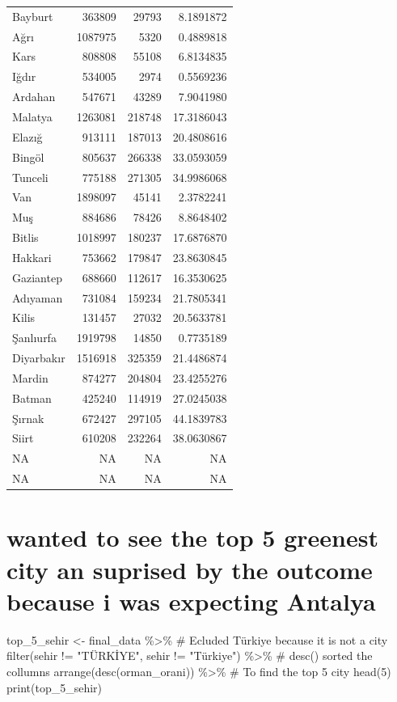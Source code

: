 \documentclass[
  11pt,
  a4paper,
  DIV=11,
  numbers=noendperiod]{scrartcl}
\newenvironment{Shaded}{\begin{snugshade}}{\end{snugshade}}
\newcommand{\CommentTok}[1]{\textcolor[rgb]{0.37,0.37,0.37}{#1}}
\newcommand{\DecValTok}[1]{\textcolor[rgb]{0.68,0.00,0.00}{#1}}
\newcommand{\FunctionTok}[1]{\textcolor[rgb]{0.28,0.35,0.67}{#1}}
\newcommand{\NormalTok}[1]{\textcolor[rgb]{0.00,0.23,0.31}{#1}}
\newcommand{\OtherTok}[1]{\textcolor[rgb]{0.00,0.23,0.31}{#1}}
\newcommand{\SpecialCharTok}[1]{\textcolor[rgb]{0.37,0.37,0.37}{#1}}
\newcommand{\StringTok}[1]{\textcolor[rgb]{0.13,0.47,0.30}{#1}}
\begin{document}
{\begin{longtable}[]{@{}lrrr@{}}
Bayburt & 363809 & 29793 & 8.1891872 \\
Ağrı & 1087975 & 5320 & 0.4889818 \\
Kars & 808808 & 55108 & 6.8134835 \\
Iğdır & 534005 & 2974 & 0.5569236 \\
Ardahan & 547671 & 43289 & 7.9041980 \\
Malatya & 1263081 & 218748 & 17.3186043 \\
Elazığ & 913111 & 187013 & 20.4808616 \\
Bingöl & 805637 & 266338 & 33.0593059 \\
Tunceli & 775188 & 271305 & 34.9986068 \\
Van & 1898097 & 45141 & 2.3782241 \\
Muş & 884686 & 78426 & 8.8648402 \\
Bitlis & 1018997 & 180237 & 17.6876870 \\
Hakkari & 753662 & 179847 & 23.8630845 \\
Gaziantep & 688660 & 112617 & 16.3530625 \\
Adıyaman & 731084 & 159234 & 21.7805341 \\
Kilis & 131457 & 27032 & 20.5633781 \\
Şanlıurfa & 1919798 & 14850 & 0.7735189 \\
Diyarbakır & 1516918 & 325359 & 21.4486874 \\
Mardin & 874277 & 204804 & 23.4255276 \\
Batman & 425240 & 114919 & 27.0245038 \\
Şırnak & 672427 & 297105 & 44.1839783 \\
Siirt & 610208 & 232264 & 38.0630867 \\
NA & NA & NA & NA \\
NA & NA & NA & NA \\
\end{longtable}
}

\section{wanted to see the top 5 greenest city an suprised by the
outcome because i was expecting
Antalya}\label{wanted-to-see-the-top-5-greenest-city-an-suprised-by-the-outcome-because-i-was-expecting-antalya}

\begin{Shaded}
\begin{Highlighting}[]
\NormalTok{top\_5\_sehir }\OtherTok{\textless{}{-}}\NormalTok{ final\_data }\SpecialCharTok{\%\textgreater{}\%}
  \CommentTok{\# Ecluded Türkiye because it is not a city}
  \FunctionTok{filter}\NormalTok{(sehir }\SpecialCharTok{!=} \StringTok{"TÜRKİYE"}\NormalTok{, sehir }\SpecialCharTok{!=} \StringTok{"Türkiye"}\NormalTok{) }\SpecialCharTok{\%\textgreater{}\%}
  \CommentTok{\# desc() sorted the collumns}
  \FunctionTok{arrange}\NormalTok{(}\FunctionTok{desc}\NormalTok{(orman\_orani)) }\SpecialCharTok{\%\textgreater{}\%}
  \CommentTok{\# To find the top 5 city}
  \FunctionTok{head}\NormalTok{(}\DecValTok{5}\NormalTok{)  }
\FunctionTok{print}\NormalTok{(top\_5\_sehir)}
\end{Highlighting}
\end{Shaded}
\end{document}
